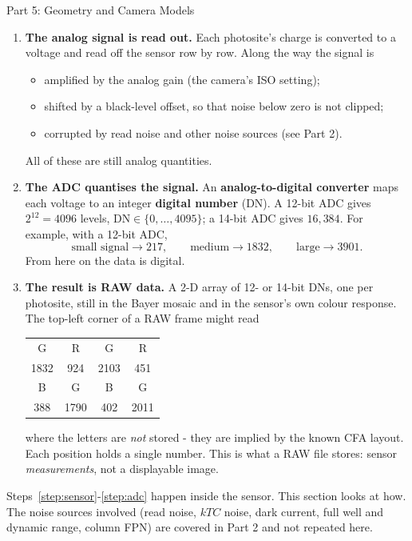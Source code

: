\documentclass[letterpaper]{article}
\begin{document}
\begin{notes}{Part 5: Geometry and Camera Models}
\begin{enumerate}[resume=steps]
    \item \textbf{The analog signal is read out.} Each photosite's charge is converted to a voltage and read off the sensor row by row. Along the way the signal is
    \begin{itemize}[noitemsep]
        \item amplified by the analog gain (the camera's ISO setting);
        \item shifted by a black-level offset, so that noise below zero is not clipped;
        \item corrupted by read noise and other noise sources (see Part 2).
    \end{itemize}
    All of these are still analog quantities.
    \item\label{step:adc} \textbf{The ADC quantises the signal.} An \textbf{analog-to-digital converter} maps each voltage to an integer \textbf{digital number} (DN). A 12-bit ADC gives $2^{12}=4096$ levels, $\mathrm{DN}\in\{0,\ldots,4095\}$; a 14-bit ADC gives $16{,}384$. For example, with a 12-bit ADC,
    $$\text{small signal}\to 217,\qquad \text{medium}\to 1832,\qquad \text{large}\to 3901.$$
    From here on the data is digital.
    \item \textbf{The result is RAW data.} A 2-D array of 12- or 14-bit DNs, one per photosite, still in the Bayer mosaic and in the sensor's own colour response. The top-left corner of a RAW frame might read
    \begin{center}
    \begin{tabular}{cccc}
        \scriptsize G & \scriptsize R & \scriptsize G & \scriptsize R \\[-3pt]
        1832 & 924 & 2103 & 451 \\
        \scriptsize B & \scriptsize G & \scriptsize B & \scriptsize G \\[-3pt]
        388 & 1790 & 402 & 2011
    \end{tabular}
    \end{center}
    where the letters are \emph{not} stored - they are implied by the known CFA layout. Each position holds a single number. This is what a RAW file stores: sensor \emph{measurements}, not a displayable image.
\end{enumerate}


Steps~\ref{step:sensor}-\ref{step:adc} happen inside the sensor. This section looks at how. The noise sources involved (read noise, $kTC$ noise, dark current, full well and dynamic range, column FPN) are covered in Part 2 and not repeated here.


\end{notes}
\end{document}
